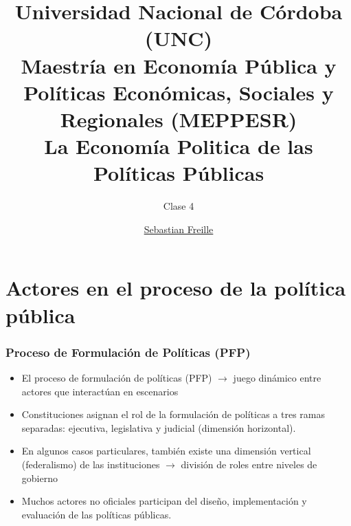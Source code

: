 \documentclass[14pt,aspectratio=169]{beamer}
\title{Universidad Nacional de Córdoba (UNC) \\ Maestría en Economía
  Pública y Políticas Económicas, Sociales y Regionales (MEPPESR) \\
  La Economía Politica de las Políticas
  Públicas}
\subtitle{Clase 4}
\author{\underline{Sebastian Freille} \inst{1}}
\institute[IEF (FCE-UNC)]{\inst{1} Instituto de Economía y Finanzas (FCE-UNC)}
\date{}
\begin{document}
\maketitle


\section{Actores en el proceso de la política pública}




  \begin{frame}\frametitle{Proceso de Formulación de Políticas (PFP)}
    \begin{itemize}
    \item El proceso de formulación de políticas (PFP)
      $\longrightarrow$ juego dinámico entre actores que interactúan
      en escenarios
      \item Constituciones asignan el rol de la
        formulación de políticas a tres ramas separadas: ejecutiva,
        legislativa y judicial (dimensión horizontal).
        \item En algunos casos particulares, también existe una
          dimensión vertical (federalismo) de las instituciones
          $\longrightarrow$ división de roles entre niveles de gobierno
          \item Muchos actores no oficiales
            participan del diseño, implementación y
            evaluación de las políticas públicas. 
        \end{itemize}
        \end{frame}
\end{document}
